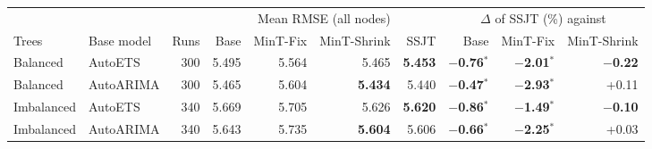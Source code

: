 \footnotesize\setlength{\tabcolsep}{4pt}
\begin{tabular}{l l r rrrr rrr}
\toprule
 & & & \multicolumn{4}{c}{Mean RMSE (all nodes)} & \multicolumn{3}{c}{$\Delta$ of SSJT (\%) against}\\
\cmidrule(lr){4-7}\cmidrule(lr){8-10}
Trees & Base model & Runs & Base & MinT-Fix & MinT-Shrink & SSJT & Base & MinT-Fix & MinT-Shrink\\
\midrule
Balanced & AutoETS & 300 & 5.495 & 5.564 & 5.465 & \textbf{5.453} & \textbf{$-$0.76}$^{\ast}$ & \textbf{$-$2.01}$^{\ast}$ & \textbf{$-$0.22}\\
Balanced & AutoARIMA & 300 & 5.465 & 5.604 & \textbf{5.434} & 5.440 & \textbf{$-$0.47}$^{\ast}$ & \textbf{$-$2.93}$^{\ast}$ & +0.11\\
Imbalanced & AutoETS & 340 & 5.669 & 5.705 & 5.626 & \textbf{5.620} & \textbf{$-$0.86}$^{\ast}$ & \textbf{$-$1.49}$^{\ast}$ & \textbf{$-$0.10}\\
Imbalanced & AutoARIMA & 340 & 5.643 & 5.735 & \textbf{5.604} & 5.606 & \textbf{$-$0.66}$^{\ast}$ & \textbf{$-$2.25}$^{\ast}$ & +0.03\\
\bottomrule
\end{tabular}
